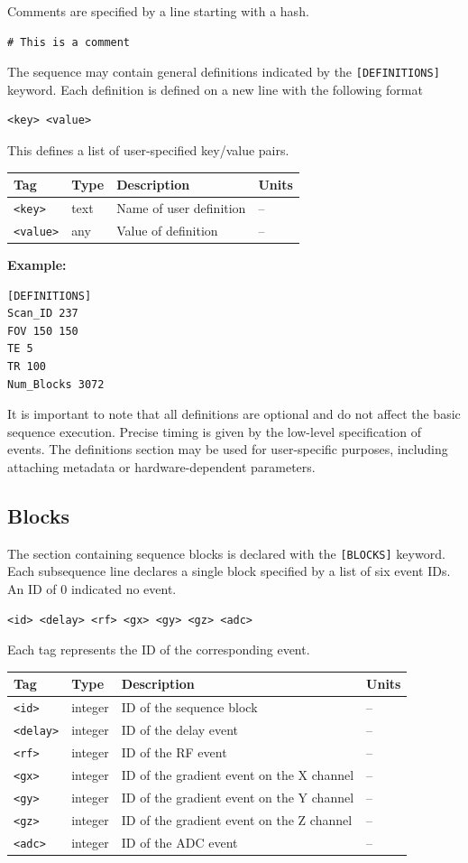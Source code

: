 \documentclass{article}
\begin{document}
Comments are specified by a line starting with a hash.
\begin{lstlisting}
# This is a comment
\end{lstlisting}

The sequence may contain general definitions indicated by the \verb.[DEFINITIONS]. keyword. Each definition is defined on a new line with the following format
\begin{lstlisting}
<key> <value>
\end{lstlisting}
This defines a list of user-specified key/value pairs.

\begin{tabularx}{\textwidth}{llXl}
\toprule
Tag & Type & Description & Units\\
\midrule
\verb.<key>. & text & Name of user definition & -- \\
\verb.<value>. & any & Value of definition & -- \\
\bottomrule
\end{tabularx}

\textbf{Example:}
\begin{lstlisting}
[DEFINITIONS]
Scan_ID 237
FOV 150 150
TE 5
TR 100
Num_Blocks 3072
\end{lstlisting}
It is important to note that all definitions are optional and do not affect the basic sequence execution. Precise timing is given by the low-level specification of events. The definitions section may be used for user-specific purposes, including attaching metadata or hardware-dependent parameters.


\subsection{Blocks}

The section containing sequence blocks is declared with the \verb.[BLOCKS]. keyword. Each subsequence line declares a single block specified by a list of six event IDs. An ID of 0 indicated no event.
\begin{lstlisting}
<id> <delay> <rf> <gx> <gy> <gz> <adc>
\end{lstlisting}

Each tag represents the ID of the corresponding event.

\begin{tabularx}{\textwidth}{llXl}
\toprule
Tag & Type & Description & Units\\
\midrule
\verb.<id>. & integer & ID of the sequence block & -- \\
\verb.<delay>. & integer & ID of the delay event & -- \\
\verb.<rf>. & integer & ID of the RF event & -- \\
\verb.<gx>. & integer & ID of the gradient event on the X channel & --\\
\verb.<gy>. & integer & ID of the gradient event on the Y channel & -- \\
\verb.<gz>. & integer & ID of the gradient event on the Z channel & -- \\
\verb.<adc>. & integer & ID of the ADC event & -- \\
\bottomrule
\end{tabularx}
\end{document}
